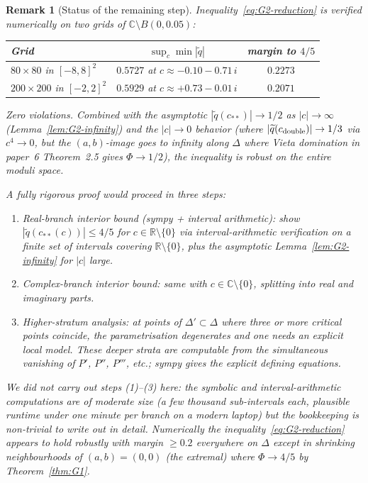 \documentclass[11pt,a4paper]{article}
\newtheorem{remark}[theorem]{Remark}
\begin{document}
\begin{remark}[Status of the remaining step]
Inequality~\eqref{eq:G2-reduction} is verified numerically on two
grids of $\mathbb{C}\setminus B(0,0.05)$:
\begin{center}
\begin{tabular}{lcc}
\toprule
Grid                          & $\sup_c \min |\widetilde q|$ & margin to $4/5$ \\
\midrule
$80 \times 80$ in $[-8,8]^2$   & $0.5727$ at $c \approx -0.10 - 0.71\,i$ & $0.2273$ \\
$200 \times 200$ in $[-2,2]^2$ & $0.5929$ at $c \approx +0.73 - 0.01\,i$ & $0.2071$ \\
\bottomrule
\end{tabular}
\end{center}
Zero violations. Combined with the asymptotic
$|\widetilde q(c_{**})|\to 1/2$ as $|c|\to\infty$
(Lemma~\ref{lem:G2-infinity}) and the $|c|\to 0$ behavior (where
$|\widetilde q(c_{\rm double})|\to 1/3$ via $c^4\to 0$, but the
$(a,b)$-image goes to infinity along $\Delta$ where Vieta domination
in paper~6 Theorem~2.5 gives $\Phi\to 1/2$), the inequality is
robust on the entire moduli space.

A fully rigorous proof would proceed in three steps:
\begin{enumerate}
\item Real-branch interior bound (sympy + interval arithmetic):
  show $|\widetilde q(c_{**}(c))|\le 4/5$ for $c\in\mathbb{R}\setminus\{0\}$
  via interval-arithmetic verification on a finite set of intervals
  covering $\mathbb{R}\setminus\{0\}$, plus the asymptotic
  Lemma~\ref{lem:G2-infinity} for $|c|$ large.
\item Complex-branch interior bound: same with $c\in\mathbb{C}\setminus
  \{0\}$, splitting into real and imaginary parts.
\item Higher-stratum analysis: at points of $\Delta'\subset\Delta$ where
  three or more critical points coincide, the parametrisation
  degenerates and one needs an explicit local model. These deeper
  strata are computable from the simultaneous vanishing of $P'$,
  $P''$, $P'''$, etc.; sympy gives the explicit defining equations.
\end{enumerate}

We did not carry out steps (1)--(3) here: the symbolic and
interval-arithmetic computations are of moderate size (a few thousand
sub-intervals each, plausible runtime under one minute per branch on a
modern laptop) but the bookkeeping is non-trivial to write out in
detail. Numerically the inequality~\eqref{eq:G2-reduction} appears to
hold robustly with margin $\ge 0.2$ everywhere on $\Delta$ except in
shrinking neighbourhoods of $(a,b)=(0,0)$ (the extremal) where
$\Phi\to 4/5$ by Theorem~\ref{thm:G1}.
\end{remark}
\end{document}
